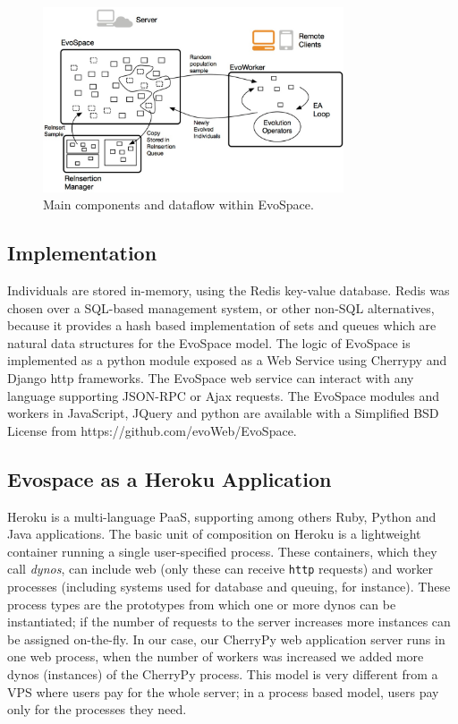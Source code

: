 \documentclass{llncs}
\begin{document}
\begin{figure}[!t]
    \centering
        \includegraphics[width=3.5in]{eps/evospaceExample.eps}
    \caption{Main components and dataflow within EvoSpace.}
    \label{fig:evo}
\end{figure}


\subsection{Implementation}
Individuals are stored in-memory, using the Redis key-value database.
Redis was chosen over a SQL-based management system, or other non-SQL alternatives, because it provides a hash based implementation of sets and queues which are natural data structures for the EvoSpace model. The logic of EvoSpace is implemented as a python module exposed as a Web Service using Cherrypy and Django http frameworks. The EvoSpace web service can interact with any language supporting JSON-RPC or Ajax requests. The EvoSpace modules and workers in JavaScript, JQuery and python are available with a Simplified BSD License from https://github.com/evoWeb/EvoSpace. 

\subsection{Evospace as a Heroku Application}
Heroku is a multi-language PaaS, supporting among others
Ruby, Python and Java applications. The basic unit of composition on
Heroku is a lightweight container running a single user-specified
process. These containers, which they call {\em dynos}, can include web
(only these can receive {\tt http} requests) and worker processes
(including systems used for database and queuing, for instance).
These  process types are the prototypes from which one or more dynos can be instantiated;
if the number of requests to the server increases
more instances can be assigned on-the-fly. In our case, our CherryPy web application server
runs in one web process, when the number of workers was increased we added more dynos (instances) of the CherryPy process.
This model is very different from a VPS where users pay for the
whole server; in a process based model, users pay only for the
processes they need.
\end{document}
